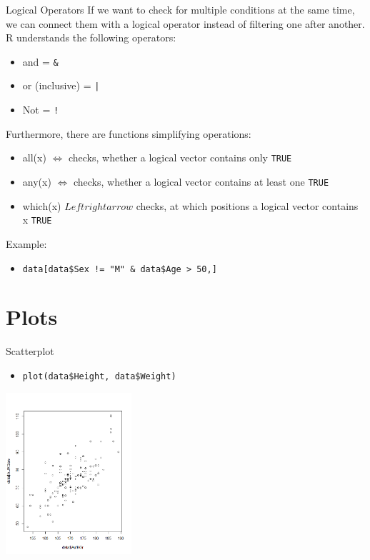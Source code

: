 \documentclass[xcolor=dvipsnames, aspectratio = 169]{beamer}
\begin{document}
\begin{frame}[fragile]{Logical Operators}
If we want to check for multiple conditions at the same time, we can connect them with a logical operator instead of filtering one after another. R understands the following operators:\\
\begin{itemize}
			\item  and = \verb+&+
			\item  or (inclusive) = \verb+|+
			\item Not = \verb+!+
\end{itemize}
Furthermore, there are functions simplifying operations:\\
\begin{itemize}
			\item all(x) $\Leftrightarrow$ checks, whether a logical vector contains only \verb+TRUE+ 
			\item any(x) $\Leftrightarrow$ checks, whether a logical vector contains at least one \verb+TRUE+
			\item which(x) $Leftrightarrow$ checks, at which positions a logical vector contains x \verb+TRUE+
\end{itemize}
Example:
	\begin{itemize}
		\item  \verb+data[data$Sex != "M" & data$Age > 50,]+
	\end{itemize}
\end{frame}


\section{Plots}

\begin{frame}[fragile]{Scatterplot}
	\begin{itemize}
		\item \verb+plot(data$Height, data$Weight)+
	\end{itemize}
			
	\begin{center}
		\includegraphics[height=6cm]{Scatterplot}
	\end{center}
\end{frame}
\end{document}
